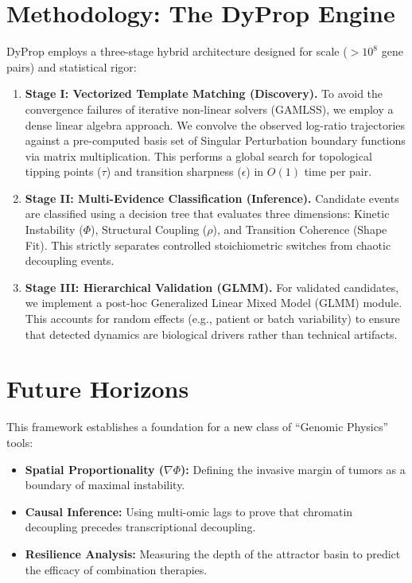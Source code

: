 \documentclass[11pt, a4paper]{article}
\begin{document}
\section{Methodology: The DyProp Engine}

DyProp employs a three-stage hybrid architecture designed for scale ($>10^8$ gene pairs) and statistical rigor:

\begin{enumerate}
    \item \textbf{Stage I: Vectorized Template Matching (Discovery).} 
    To avoid the convergence failures of iterative non-linear solvers (GAMLSS), we employ a dense linear algebra approach. We convolve the observed log-ratio trajectories against a pre-computed basis set of Singular Perturbation boundary functions via matrix multiplication. This performs a global search for topological tipping points ($\tau$) and transition sharpness ($\epsilon$) in $O(1)$ time per pair.
    
    \item \textbf{Stage II: Multi-Evidence Classification (Inference).} 
    Candidate events are classified using a decision tree that evaluates three dimensions: Kinetic Instability ($\Phi$), Structural Coupling ($\rho$), and Transition Coherence (Shape Fit). This strictly separates controlled stoichiometric switches from chaotic decoupling events.
    
    \item \textbf{Stage III: Hierarchical Validation (GLMM).} 
    For validated candidates, we implement a post-hoc Generalized Linear Mixed Model (GLMM) module. This accounts for random effects (e.g., patient or batch variability) to ensure that detected dynamics are biological drivers rather than technical artifacts.
\end{enumerate}

\section{Future Horizons}
This framework establishes a foundation for a new class of ``Genomic Physics'' tools:
\begin{itemize}
    \item \textbf{Spatial Proportionality ($\nabla \Phi$):} Defining the invasive margin of tumors as a boundary of maximal instability.
    \item \textbf{Causal Inference:} Using multi-omic lags to prove that chromatin decoupling precedes transcriptional decoupling.
    \item \textbf{Resilience Analysis:} Measuring the depth of the attractor basin to predict the efficacy of combination therapies.
\end{itemize}
\end{document}
